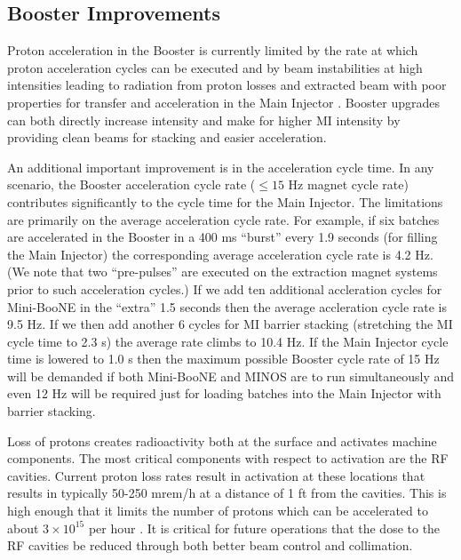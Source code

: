\documentclass{article}
\begin{document}
\subsection {Booster Improvements}

Proton acceleration in the Booster is currently limited by the rate at
which proton acceleration cycles can be executed and by
beam instabilities at high intensities leading to radiation from proton losses
and extracted beam with poor properties for transfer and acceleration in
the Main Injector \cite {Webber}. Booster
upgrades can both directly increase intensity and make for higher MI 
intensity by providing clean beams for stacking and easier acceleration.

An additional important improvement is in the acceleration cycle time. 
In any scenario, the Booster acceleration cycle rate ($\le 15$ Hz
magnet cycle rate) contributes significantly to the cycle time for the
Main Injector. The limitations are primarily on the average acceleration
cycle rate. For example, if six batches are accelerated in the Booster
in a 400 ms ``burst'' every 1.9 seconds (for filling the Main Injector)
the corresponding average acceleration cycle rate is 4.2 Hz. (We note that
two ``pre-pulses'' are executed on the extraction magnet systems prior to
such acceleration cycles.)
If we add
ten additional accleration cycles for Mini-BooNE in the ``extra'' 1.5 seconds
then the average accleration cycle rate is 9.5 Hz. If we then add
another 6 cycles for MI barrier stacking (stretching the MI cycle time
to 2.3 s) the average rate climbs to
10.4 Hz. If the Main Injector cycle time is lowered to 1.0 s then the
maximum possible Booster cycle rate of 15 Hz will be demanded if both
Mini-BooNE and MINOS are to run simultaneously and even 12 Hz will be 
required just for loading batches into the Main Injector with barrier
stacking.

Loss of protons creates radioactivity both at the surface and activates
machine components. The most critical components with respect to activation
are the RF cavities. Current proton loss rates result in activation at
these locations that results in typically 50-250 mrem/h at a distance of
1 ft from the cavities. This is high enough that it limits the number of
protons which can be accelerated to about $3\times10^{15}$ per hour
\cite {Webber3}. It is critical for future operations that the dose to the
RF cavities be reduced through both better beam control and collimation.
\end{document}

